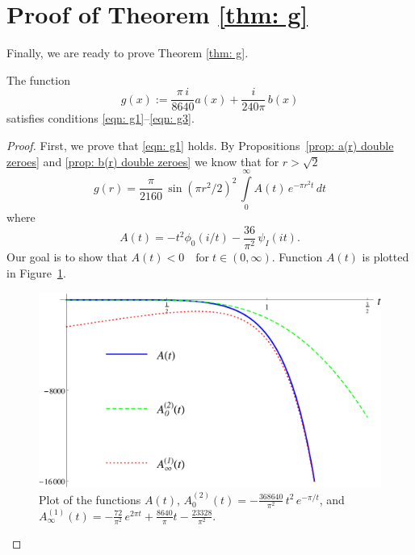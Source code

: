 \section{Proof of Theorem \ref{thm: g}}\label{sec: g}
Finally, we are ready to prove Theorem \ref{thm: g}.
\begin{theorem}\label{thm: g1}
The function
$$g(x):=\frac{\pi\,i}{8640}a(x)+\frac{i}{240\pi}\,b(x)$$
satisfies conditions \eqref{eqn: g1}--\eqref{eqn: g3}.
\end{theorem}
\begin{proof}
First, we prove that \eqref{eqn: g1} holds. By Propositions~\ref{prop: a(r) double zeroes} and \ref{prop: b(r) double zeroes} we know that for $r>\sqrt{2}$
\begin{equation}\label{eqn: g A} g(r)=\frac{\pi}{2160}\,\sin(\pi r^2/2)^2\,\int\limits_0^\infty A(t)\,e^{-\pi r^2 t}\,dt\end{equation}
where $$A(t)=-t^2\phi_0(i/t)-\frac{36}{\pi^2}\,\psi_I(it).$$
Our goal is to show that $A(t)<0\quad\mbox{for}\;t\in(0,\infty).$ Function $A(t)$ is plotted in Figure~\ref{fig: A}.
\begin{figure}[h!]
\caption{Plot of the functions $A(t)$, $A^{(2)}_0(t)=-\frac{368640}{\pi^2}\,t^2\,e^{-\pi /t}$, and $A^{(1)}_\infty(t)=-\frac{72}{\pi^2}\,e^{2\pi t}+\frac{8640}{\pi}t-\frac{23328}{\pi^2}$.\label{fig: A}}
  \centering
\includegraphics[width=300 pt]{graphics/e8plot_A.pdf}
\end{figure}


\end{proof}
